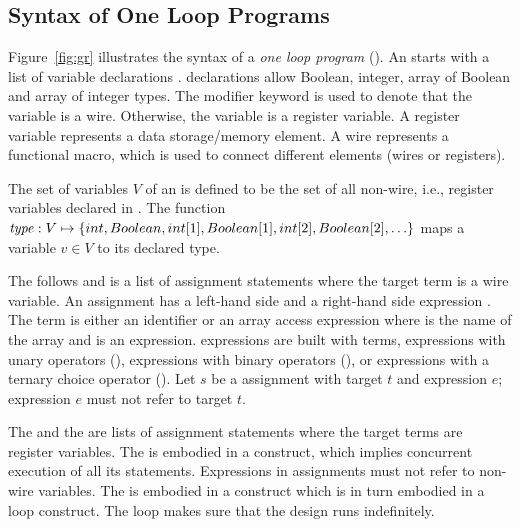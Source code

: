 \subsection{Syntax of One Loop Programs}
%

Figure~\ref{fig:gr} illustrates the syntax of a 
{\em one loop program} (\caig).
An \caig starts with 
a list of variable declarations . 
\caig declarations allow Boolean, integer, array of Boolean 
and array of integer types.
The  modifier keyword is used to denote that 
the variable is a wire. 
Otherwise, the variable is a register variable. 
A register variable represents a data storage/memory element. A wire represents a functional macro, which is used 
to connect different elements (wires or registers).


\begin{definition}
The set of variables $V$ of an \caig is defined to be 
the set of all non-wire, i.e., register variables declared in .
The function $\mathit{type}: V \mapsto \{ int, Boolean, int[1], Boolean[1], int[2], Boolean[2], \ldots \}$ maps a variable
$v \in V$ to its declared type. 
\end{definition}


The  follows  and is a list 
of assignment statements where the target term is a wire 
variable. 
An assignment has a left-hand side  and 
a right-hand side expression . 
The term is either an identifier  or an array 
access expression  where  is the name
of the array and  is an expression. 
\caig expressions are built with terms, expressions with unary
operators (\cci{-,!}), expressions with binary operators (\cci{+,-,*,/,<,>,<=,>=,==,\&\&,||}), 
or expressions with a ternary choice operator 
(). 
Let $s$ be a  assignment with target $t$ and 
expression $e$; expression $e$ must not refer to target $t$. 



The  and the  are lists 
of assignment statements where the target terms are register variables.
The  is embodied in a  
construct, which implies concurrent execution of all its statements. 
Expressions in  assignments 
must not refer to non-wire
variables. 
The  is embodied in a  construct
which is in turn embodied in a  loop construct. 
The loop makes sure that the design runs indefinitely.



